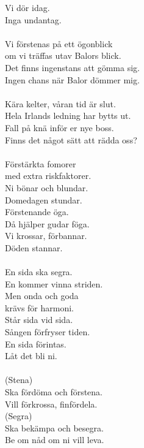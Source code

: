 \documentclass[a6paper, 10pt, twoside]{article}
\begin{document}

\begin{center}
\end{center}
\begin{lyrics}
Vi dör idag. \\
Inga undantag. \\
\\
Vi förstenas på ett ögonblick \\
om vi träffas utav Balors blick. \\
Det finns ingenstans att gömma sig. \\
Ingen chans när Balor dömmer mig. \\
\\
Kära kelter, våran tid är slut. \\
Hela Irlands ledning har bytts ut. \\
Fall på knä inför er nye boss. \\
Finns det något sätt att rädda oss? \\
\\
Förstärkta fomorer \\
med extra riskfaktorer. \\
Ni bönar och blundar. \\
Domedagen stundar. \\
Förstenande öga. \\
Då hjälper gudar föga. \\
Vi krossar, förbannar. \\
Döden stannar. \\
\\
En sida ska segra. \\
En kommer vinna striden. \\
Men onda och goda \\
krävs för harmoni. \\
Står sida vid sida. \\
Sången förfryser tiden. \\
En sida förintas. \\
Låt det bli ni. \\
\\
(Stena)\\
Ska fördöma och förstena.\\
Vill förkrossa, finfördela. \\
(Segra)\\
Ska bekämpa och besegra. \\ 
Be om nåd om ni vill leva. \\

\end{lyrics}
\end{document}
